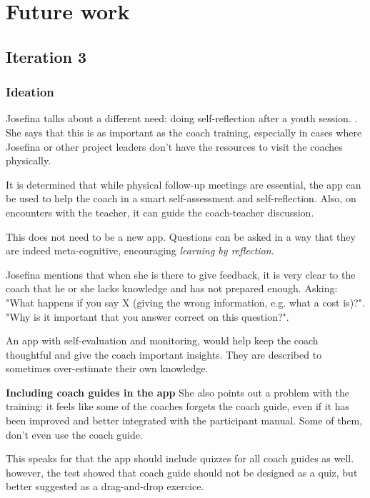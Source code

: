 \section{Future work}

\subsection{Iteration 3}

\subsubsection{Ideation}

Josefina talks about a different need: doing self-reflection after a youth session. . She says that this is  as important as the coach training, especially in cases where Josefina or other project leaders don't have the resources to visit the coaches physically.

It is determined that while physical follow-up meetings are essential, the app can be used to help the coach in a smart self-assessment and self-reflection. Also, on encounters with the teacher, it can guide the coach-teacher discussion.

This does not need to be a new app. Questions can be asked in a way that they are indeed meta-cognitive, encouraging \textit{learning by reflection}.

Josefina mentions that when she is there to give feedback, it is very clear to the coach that he or she lacks knowledge and has not prepared enough. Asking: "What happens if you say X (giving the wrong information, e.g. what a cost is)?". "Why is it important that you answer correct on this question?".

An app with self-evaluation and monitoring, would help keep the coach thoughtful and give the coach important insights. They are described to sometimes over-estimate their own knowledge.

\textbf{Including coach guides in the app}
She also points out a problem with the training: it feels like some of the coaches forgets the coach guide, even if it has been improved and better integrated with the participant manual. Some of them, don't even use the coach guide.

This speaks for that the app should include quizzes for all coach guides as well. however, the test showed that coach guide should not be designed as a quiz, but better suggested as a drag-and-drop exercice.

